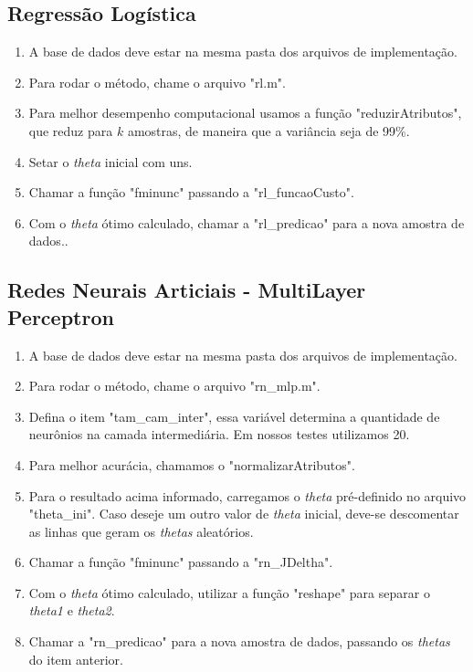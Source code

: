 \documentclass[10pt, conference, compsocconf]{IEEEtran}
\begin{document}
\subsection{Regressão Logística}
\begin{enumerate}
\item A base de dados deve estar na mesma pasta dos arquivos de implementação.
\item Para rodar o método, chame o arquivo "rl.m".
\item Para melhor desempenho computacional usamos a função "reduzirAtributos", que reduz para $k$ amostras, de maneira que a variância seja de 99\%.
\item Setar o \textit{theta} inicial com uns.
\item Chamar a função "fminunc" passando a "rl\_funcaoCusto".
\item Com o \textit{theta} ótimo calculado, chamar a "rl\_predicao" para a nova amostra de dados..
\end{enumerate}

\subsection{Redes Neurais Articiais - MultiLayer Perceptron}
\begin{enumerate}
\item A base de dados deve estar na mesma pasta dos arquivos de implementação.
\item Para rodar o método, chame o arquivo "rn\_mlp.m".
\item Defina o item "tam\_cam\_inter", essa variável determina a quantidade de neurônios na camada intermediária. Em nossos testes utilizamos 20.
\item Para melhor acurácia, chamamos o "normalizarAtributos".
\item Para o resultado acima informado, carregamos o \textit{theta} pré-definido no arquivo "theta\_ini". Caso deseje um outro valor de \textit{theta} inicial, deve-se descomentar as linhas que geram os \textit{thetas} aleatórios.
\item Chamar a função "fminunc" passando a "rn\_JDeltha".
\item Com o \textit{theta} ótimo calculado, utilizar a função "reshape" para separar o \textit{theta1} e \textit{theta2}.
\item Chamar a "rn\_predicao" para a nova amostra de dados, passando os \textit{thetas} do item anterior.
\end{enumerate}
\end{document}
